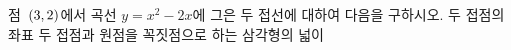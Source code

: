 점~$(3{,}\mkern3mu\mathopen{}2)$에서 곡선 $y=x^2-2x$에 그은 두 접선에 대하여 다음을 구하시오.
 두 접점의 좌표
 두 접점과 원점을 꼭짓점으로 하는 삼각형의 넓이
